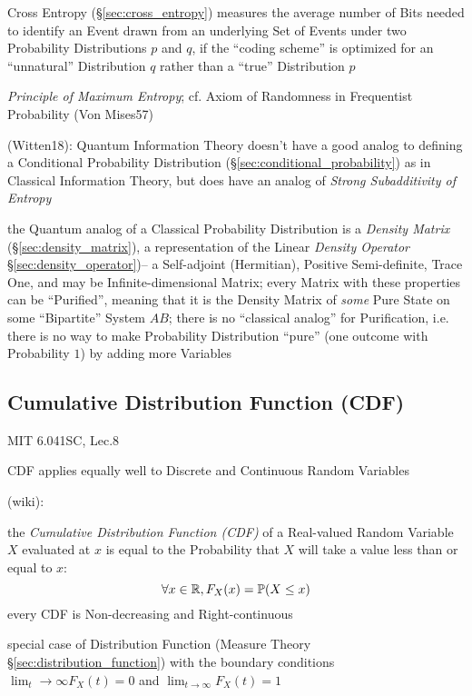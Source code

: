 Cross Entropy (\S\ref{sec:cross_entropy}) measures the average number of Bits
needed to identify an Event drawn from an underlying Set of Events under two
Probability Distributions $p$ and $q$, if the ``coding scheme'' is optimized for
an ``unnatural'' Distribution $q$ rather than a ``true'' Distribution $p$

\emph{Principle of Maximum Entropy}; cf. Axiom of Randomness in Frequentist
Probability (Von Mises57)

(Witten18): Quantum Information Theory doesn't have a good analog to defining a
Conditional Probability Distribution (\S\ref{sec:conditional_probability}) as in
Classical Information Theory, but does have an analog of \emph{Strong
  Subadditivity of Entropy}

the Quantum analog of a Classical Probability Distribution is a \emph{Density
  Matrix} (\S\ref{sec:density_matrix}), a representation of the Linear
\emph{Density Operator} \S\ref{sec:density_operator})-- a Self-adjoint
(Hermitian), Positive Semi-definite, Trace One, and may be Infinite-dimensional
Matrix; every Matrix with these properties can be ``Purified'', meaning that it
is the Density Matrix of \emph{some} Pure State on some ``Bipartite'' System
$AB$; there is no ``classical analog'' for Purification, i.e. there is no way to
make Probability Distribution ``pure'' (one outcome with Probability $1$) by
adding more Variables



\subsection{Cumulative Distribution Function (CDF)}\label{sec:cdf}

MIT 6.041SC, Lec.8

CDF applies equally well to Discrete and Continuous Random Variables

(wiki):

the \emph{Cumulative Distribution Function (CDF)} of a Real-valued Random
Variable $X$ evaluated at $x$ is equal to the Probability that $X$ will take a
value less than or equal to $x$:
\[
  \forall x \in \mathbb{R}, F_X(x) = \mathbb{P}(X \leq x)
\]
every CDF is Non-decreasing and Right-continuous

special case of Distribution Function (Measure Theory
\S\ref{sec:distribution_function}) with the boundary conditions
$\lim_t\to\infty F_X(t) = 0$ and $\lim_{t\to\infty}F_X(t) = 1$

